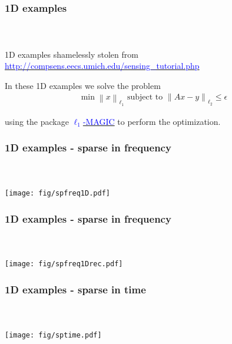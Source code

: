 \documentclass[mathserif,18pt,xcolor=table]{beamer}
\newcommand{\norm}[1]{\left\lVert #1 \right\rVert}
\begin{document}
\appendix



\begin{frame}[t]
\frametitle{1D examples}
\framesubtitle{~~}  %

1D examples shamelessly stolen from
\href{http://compsens.eecs.umich.edu/sensing_tutorial.php}{\textcolor{blue}{http://compsens.eecs.umich.edu/sensing\_tutorial.php}}

In these 1D examples we solve the problem
\begin{align*}
	\min \norm{x}_{\ell_1} \text{ subject to } \norm{Ax - y}_{\ell_2} \leq \epsilon
\end{align*}

using the package \href{http://users.ece.gatech.edu/~justin/l1magic/}{\textcolor{blue}{$\ell_1$-MAGIC}} to perform the optimization.

\end{frame}


\begin{frame}[t]
\frametitle{1D examples - sparse in frequency}
\framesubtitle{~~}  %

\centering
\texttt{[image: fig/spfreq1D.pdf]}

\end{frame}


\begin{frame}[t]
\frametitle{1D examples - sparse in frequency}
\framesubtitle{~~}  %

\centering
\texttt{[image: fig/spfreq1Drec.pdf]}

\end{frame}


\begin{frame}[t]
\frametitle{1D examples - sparse in time}
\framesubtitle{~~}  %

\centering
\texttt{[image: fig/sptime.pdf]}

\end{frame}
\end{document}
